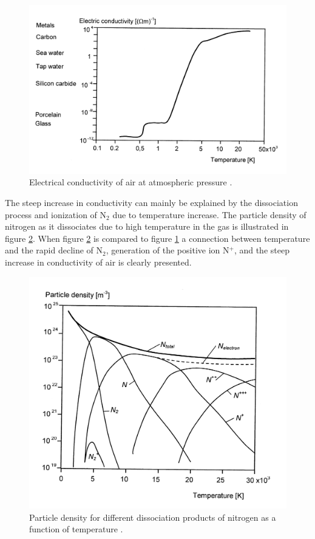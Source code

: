 \documentclass[10pt,a4paper,twoside]{article}
\begin{document}
\begin{figure}[H]
\centering
\includegraphics[scale=0.8]{Bilder/Theory/airConduct.png}
\caption{Electrical conductivity of air at atmospheric pressure \cite{bib:HVEbreak}.} \label{fig:condAir}
\end{figure}

The steep increase in conductivity can mainly be explained by the dissociation process and ionization of N$_2$ due to temperature increase. The particle density of nitrogen as it dissociates due to high temperature in the gas is illustrated in figure \ref{fig:Ndensi}. When figure \ref{fig:Ndensi} is compared to figure \ref{fig:condAir} a connection between temperature and the rapid decline of N$_2$, generation of the positive ion N$^+$, and the steep increase in conductivity of air is clearly presented.

\begin{figure}[H]
\centering
\includegraphics[scale=0.8]{Bilder/Theory/particleDensNit.png}
\caption{Particle density for different dissociation products of nitrogen as a function of temperature \cite{bib:HVEbreak}.} \label{fig:Ndensi}
\end{figure}
\end{document}
